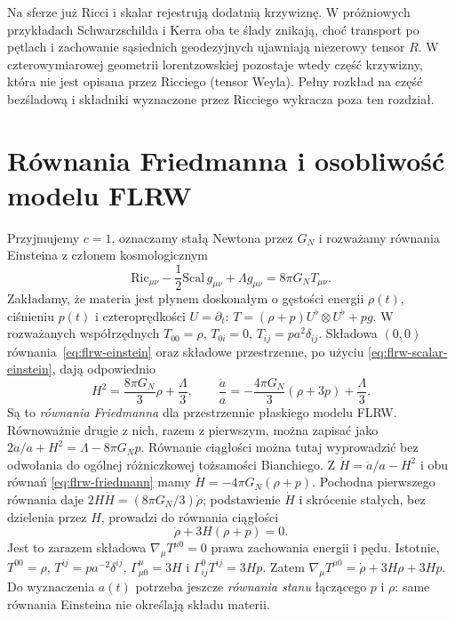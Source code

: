 \begin{uwaga}
Na sferze już Ricci i skalar rejestrują dodatnią
krzywiznę. W próżniowych przykładach Schwarzschilda
i Kerra oba te ślady znikają, choć transport po
pętlach i zachowanie sąsiednich geodezyjnych ujawniają
niezerowy tensor $R$. W czterowymiarowej geometrii
lorentzowskiej pozostaje wtedy część krzywizny,
która nie jest opisana przez Ricciego (tensor Weyla).
Pełny rozkład na część bezśladową i składniki
wyznaczone przez Ricciego wykracza poza ten rozdział.
\end{uwaga}

\section{Równania Friedmanna i osobliwość modelu FLRW}

\begin{przyklad}
\label{prz:flrw-friedmann}
Przyjmujemy $c=1$, oznaczamy stałą Newtona przez $G_{\!N}$
i rozważamy równania Einsteina z członem kosmologicznym
\begin{equation}\label{eq:flrw-einstein}
 \mathrm{Ric}_{\mu\nu}-\frac12\mathrm{Scal}\,g_{\mu\nu}
 +\Lambda g_{\mu\nu}=8\pi G_{\!N}T_{\mu\nu}.
\end{equation}
Zakładamy, że materia jest płynem doskonałym
o gęstości energii $\rho(t)$, ciśnieniu $p(t)$
i czteroprędkości $U=\partial_t$:
$T=(\rho+p)U^\flat\otimes U^\flat+pg$.
W rozważanych współrzędnych $T_{00}=\rho$,
$T_{0i}=0$, $T_{ij}=pa^2\delta_{ij}$.
Składowa $(0,0)$ równania~\eqref{eq:flrw-einstein}
oraz składowe przestrzenne, po użyciu
\eqref{eq:flrw-scalar-einstein}, dają odpowiednio
\begin{equation}\label{eq:flrw-friedmann}
 H^2=\frac{8\pi G_{\!N}}3\rho+\frac{\Lambda}{3},
 \qquad
 \frac{\ddot a}{a}=-\frac{4\pi G_{\!N}}3(\rho+3p)
 +\frac{\Lambda}{3}.
\end{equation}
Są to \emph{równania Friedmanna} dla przestrzennie płaskiego
modelu FLRW. Równoważnie drugie z nich, razem z pierwszym,
można zapisać jako
$2\ddot a/a+H^2=\Lambda-8\pi G_{\!N}p$.
Równanie ciągłości można tutaj wyprowadzić bez odwołania
do ogólnej różniczkowej tożsamości Bianchiego.
Z $\dot H=\ddot a/a-H^2$ i obu równań
\eqref{eq:flrw-friedmann} mamy
$\dot H=-4\pi G_{\!N}(\rho+p)$.
Pochodna pierwszego równania daje
$2H\dot H=(8\pi G_{\!N}/3)\dot\rho$; podstawienie
$\dot H$ i skrócenie stałych, bez dzielenia przez $H$,
prowadzi do równania ciągłości
\begin{equation}\label{eq:flrw-ciaglosc}
 \dot\rho+3H(\rho+p)=0.
\end{equation}
Jest to zarazem składowa $\nabla_\mu T^{\mu0}=0$
prawa zachowania energii i pędu.
Istotnie, $T^{00}=\rho$, $T^{ij}=pa^{-2}\delta^{ij}$,
$\Gamma^\mu_{\mu0}=3H$ i
$\Gamma^0_{ij}T^{ij}=3Hp$. Zatem
$\nabla_\mu T^{\mu0}
=\dot\rho+3H\rho+3Hp$.
Do wyznaczenia $a(t)$ potrzeba jeszcze \emph{równania stanu}
łączącego $p$ i $\rho$: same równania Einsteina
nie określają składu materii.
\end{przyklad}

